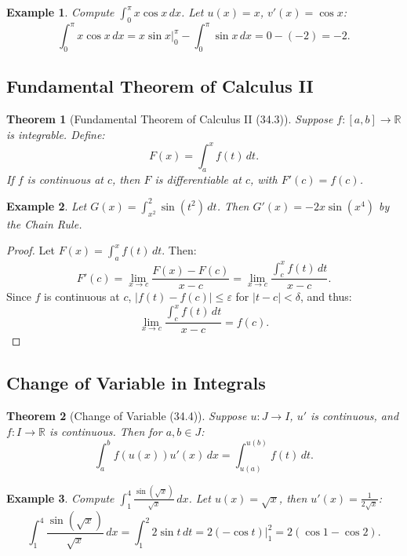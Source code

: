 \documentclass[9pt]{article}
\theoremstyle{definition}
\theoremstyle{plain}
\newtheorem{theorem}{Theorem}
\newtheorem{example}{Example}
\begin{document}
\begin{example}
Compute \( \int_0^\pi x \cos x \, dx \). Let \( u(x) = x \), \( v'(x) = \cos x \):
\[
\int_0^\pi x \cos x \, dx = x \sin x \big|_0^\pi - \int_0^\pi \sin x \, dx = 0 - (-2) = -2.
\]
\end{example}

\subsection*{Fundamental Theorem of Calculus II}
\begin{theorem}[Fundamental Theorem of Calculus II (34.3)]
Suppose \( f : [a, b] \to \mathbb{R} \) is integrable. Define:
\[
F(x) = \int_a^x f(t) \, dt.
\]
If \( f \) is continuous at \( c \), then \( F \) is differentiable at \( c \), with \( F'(c) = f(c) \).
\end{theorem}

\begin{example}
Let \( G(x) = \int_{x^2}^2 \sin(t^2) \, dt \). Then \( G'(x) = -2x \sin(x^4) \) by the Chain Rule.
\end{example}

\begin{proof}
Let \( F(x) = \int_a^x f(t) \, dt \). Then:
\[
F'(c) = \lim_{x \to c} \frac{F(x) - F(c)}{x - c} = \lim_{x \to c} \frac{\int_c^x f(t) \, dt}{x - c}.
\]
Since \( f \) is continuous at \( c \), \( |f(t) - f(c)| \leq \varepsilon \) for \( |t - c| < \delta \), and thus:
\[
\lim_{x \to c} \frac{\int_c^x f(t) \, dt}{x - c} = f(c).
\]
\end{proof}

\subsection*{Change of Variable in Integrals}
\begin{theorem}[Change of Variable (34.4)]
Suppose \( u : J \to I \), \( u' \) is continuous, and \( f : I \to \mathbb{R} \) is continuous. Then for \( a, b \in J \):
\[
\int_a^b f(u(x)) u'(x) \, dx = \int_{u(a)}^{u(b)} f(t) \, dt.
\]
\end{theorem}

\begin{example}
Compute \( \int_1^4 \frac{\sin(\sqrt{x})}{\sqrt{x}} \, dx \). Let \( u(x) = \sqrt{x} \), then \( u'(x) = \frac{1}{2\sqrt{x}} \):
\[
\int_1^4 \frac{\sin(\sqrt{x})}{\sqrt{x}} \, dx = \int_1^2 2 \sin t \, dt = 2(-\cos t) \big|_1^2 = 2(\cos 1 - \cos 2).
\]
\end{example}
\end{document}
